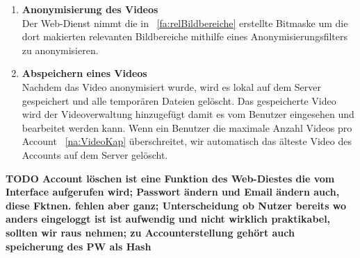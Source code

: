 \begin{enumerate}
\item  \label{fa:anonymVideo}\textbf{Anonymisierung des Videos} \hfill \\
Der \gls{Web-Dienst} nimmt die in ~\eqref{fa:relBildbereiche} erstellte Bitmaske um die dort makierten relevanten Bildbereiche mithilfe eines Anonymisierungsfilters zu \gls{anonymisieren}.

\item \label{fa:speichVideo}\textbf{Abspeichern eines  Videos} \hfill \\
Nachdem das Video anonymisiert wurde, wird es lokal auf dem Server gespeichert und alle temporären Dateien gelöscht. Das gespeicherte Video wird der Videoverwaltung hinzugefügt damit es vom Benutzer eingesehen und bearbeitet werden kann. Wenn ein Benutzer die maximale Anzahl Videos pro Account ~\eqref{na:VideoKap} überschreitet, wir automatisch das älteste Video des Accounts auf dem Server gelöscht.
\end{enumerate}

\textbf{TODO Account löschen ist eine Funktion des Web-Diestes die vom Interface aufgerufen wird; Passwort ändern und Email ändern auch, diese Fktnen. fehlen aber ganz; Unterscheidung ob Nutzer bereits wo anders eingeloggt ist ist aufwendig und nicht wirklich praktikabel, sollten wir raus nehmen; zu Accounterstellung gehört auch speicherung des PW als Hash }

